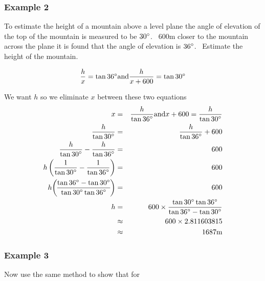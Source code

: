 \subsubsection{Example 2}
To estimate the height of a mountain above a level plane the angle of elevation of the top of the mountain is measured to be $30 \mbox{{\ensuremath{{}^\circ}}}$. \ $600 \mbox{m}$ closer to the mountain across the plane it is found that the angle of elevation
is $36 \mbox{{\ensuremath{{}^\circ}}}$. \ Estimate the height of the mountain. 

   
\setlength\fboxrule{0in}\setlength\fboxsep{0.2in}


\begin{equation*}\frac{h}{x} =\tan  36 \mbox{{\ensuremath{{}^\circ}}}\text{and}\frac{h}{x +600} =\tan  30 \mbox{{\ensuremath{{}^\circ}}}
\end{equation*}

We want $h$ so we eliminate $x$ between these two equations
\begin{align*}x &  = & \frac{h}{\tan  36 \mbox{{\ensuremath{{}^\circ}}}}\text{and}x +600 =\frac{h}{\tan  30 \mbox{{\ensuremath{{}^\circ}}}} \\
\frac{h}{\tan  30 \mbox{{\ensuremath{{}^\circ}}}} &  = & \frac{h}{\tan  36 \mbox{{\ensuremath{{}^\circ}}}} +600 \\
\frac{h}{\tan  30 \mbox{{\ensuremath{{}^\circ}}}} -\frac{h}{\tan  36 \mbox{{\ensuremath{{}^\circ}}}} &  = & 600 \\
h \left (\frac{1}{\tan  30 \mbox{{\ensuremath{{}^\circ}}}} -\frac{1}{\tan  36 \mbox{{\ensuremath{{}^\circ}}}}\right ) &  = & 600 \\
h \genfrac{(}{)}{}{}{\tan  36 \mbox{{\ensuremath{{}^\circ}}} -\tan  30 \mbox{{\ensuremath{{}^\circ}}}}{\tan  30 \mbox{{\ensuremath{{}^\circ}}} \tan  36 \mbox{{\ensuremath{{}^\circ}}}} &  = & 600 \\
h &  = & 600 \times \frac{\tan  30 \mbox{{\ensuremath{{}^\circ}}} \tan  36 \mbox{{\ensuremath{{}^\circ}}}}{\tan  36 \mbox{{\ensuremath{{}^\circ}}} -\tan  30 \mbox{{\ensuremath{{}^\circ}}}} \\
 &  \approx  & 600 \times 2.811603815 \\
 &  \approx  & 1687 \mbox{m}\end{align*}

\subsubsection{Example 3}
Now use the same method to show that for 

